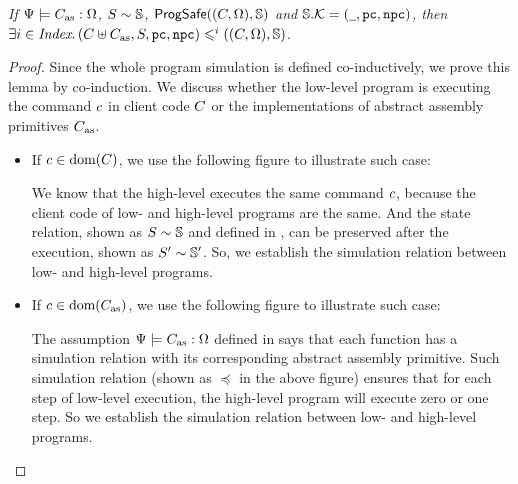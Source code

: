{\begin{lemma}
    \label{lemma:function sim implies whole program sim}
    \em
    If ${\Psi} \models {C_{\text{as}}} : {\Omega}$,
    ${S} \sim {\mathbb{S}}$,
    $\textsf{ProgSafe}((C, \Omega), \mathbb{S})$ and
    $\mathbb{S}.\mathcal{K} = (\underline{\ \,}, \texttt{pc}, \texttt{npc})$,
    then
    $\exists i \in \textit{Index}. \,
    (C\uplus C_{\text{as}}, S, \texttt{pc}, \texttt{npc})
    \leqslant^{i} ((C, \Omega), \mathbb{S})$.
\end{lemma}
\begin{proof}
    Since the whole program simulation is defined
    co-inductively, we prove this lemma by co-induction.
    We discuss whether the low-level program
    is executing the command $c$ in client code
    $C$ or the implementations of
    abstract assembly primitives $C_{\text{as}}$.
    \begin{itemize}
        \item If $c \in \text{dom}(C)$, we use the
            following figure to illustrate such case:
            \begin{center}
                \vspace*{-0.5em}
                
                \vspace*{-0.5em}
            \end{center}
            We know that the high-level executes the same command
            $c$, because the client code of low- and
            high-level programs are the same.
            And the state relation, shown as ${S} \sim {\mathbb{S}}$
            and defined in \Sec{\ref{subsec:correctness-primitive}},
            can be preserved after the execution, shown
            as ${S'} \sim {\mathbb{S}'}$. So, we
            establish the simulation relation between
            low- and high-level programs.

        \item If $c \in \text{dom}(C_{\text{as}})$, we use the
            following figure to illustrate such case:
            \begin{center}
                \vspace*{-0.5em}
                
                \vspace*{-0.5em}
            \end{center}
            The assumption ${\Psi} \models {C_{\text{as}}} : {\Omega}$
            defined in \Def{\ref{def:wdprim-sem}} says that
            each \sparc{} function has a simulation relation
            with its corresponding abstract assembly primitive.
            Such simulation relation
            (shown as $\preccurlyeq$ in the above figure)
            ensures that for each step
            of low-level execution, the high-level program will
            execute zero or one step. So we 
            establish the simulation relation between 
            low- and high-level programs. 
    \end{itemize}


\end{proof}}
